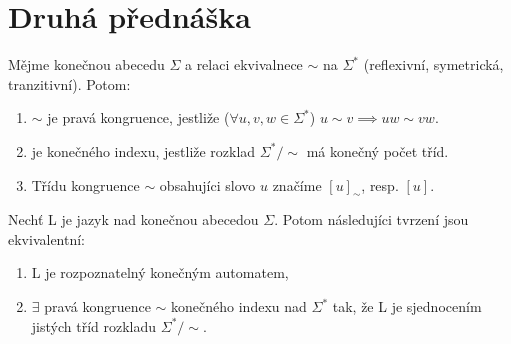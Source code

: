 \documentclass[../main.tex]{subfiles}
\begin{document}
\section{Druhá přednáška}

\begin{definition}[Kongruence]
    Mějme konečnou abecedu $\Sigma$ a relaci ekvivalnece $\sim$ na $\Sigma^*$ 
    (reflexivní, symetrická, tranzitivní). Potom:
    \begin{enumerate}
        \item $\sim$ je pravá kongruence, jestliže ($\forall u,v,w \in \Sigma^*$)
        $u\sim v \implies uw \sim vw$.
        \item je konečného indexu, jestliže rozklad $\Sigma^*/\sim$ má konečný počet
        tříd.
        \item Třídu kongruence $\sim$ obsahujíci slovo $u$ značíme $[u]_\sim$, resp. $[u]$.
    \end{enumerate}
\end{definition}
\begin{theorem}
    Nechť L je jazyk nad konečnou abecedou $\Sigma$. Potom následujíci tvrzení jsou ekvivalentní:
    \begin{enumerate}
        \item L je rozpoznatelný konečným automatem,
        \item $\exists$ pravá kongruence $\sim$ konečného indexu nad $\Sigma^*$ tak,
        že L je sjednocením jistých tříd rozkladu $\Sigma^*/\sim$.
    \end{enumerate}
\end{theorem}
\end{document}
